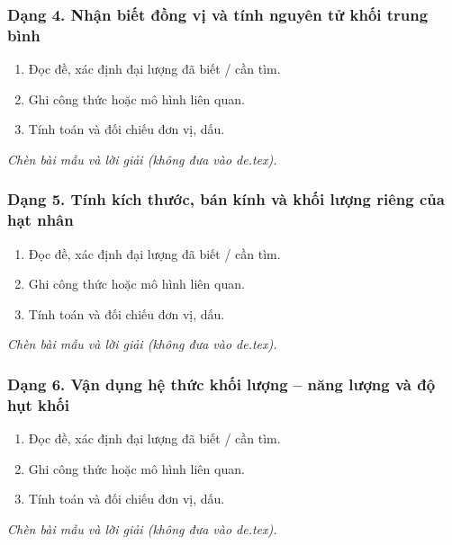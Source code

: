 \subsubsection{Dạng 4. Nhận biết đồng vị và tính nguyên tử khối trung bình}
\begin{phuongphap}
\begin{enumerate}
\item Đọc đề, xác định đại lượng đã biết / cần tìm.
\item Ghi công thức hoặc mô hình liên quan.
\item Tính toán và đối chiếu đơn vị, dấu.
\end{enumerate}
\end{phuongphap}
\begin{vidumau}
\textit{Chèn bài mẫu và lời giải (không đưa vào de.tex).}
\end{vidumau}

\subsubsection{Dạng 5. Tính kích thước, bán kính và khối lượng riêng của hạt nhân}
\begin{phuongphap}
\begin{enumerate}
\item Đọc đề, xác định đại lượng đã biết / cần tìm.
\item Ghi công thức hoặc mô hình liên quan.
\item Tính toán và đối chiếu đơn vị, dấu.
\end{enumerate}
\end{phuongphap}
\begin{vidumau}
\textit{Chèn bài mẫu và lời giải (không đưa vào de.tex).}
\end{vidumau}

\subsubsection{Dạng 6. Vận dụng hệ thức khối lượng – năng lượng và độ hụt khối}
\begin{phuongphap}
\begin{enumerate}
\item Đọc đề, xác định đại lượng đã biết / cần tìm.
\item Ghi công thức hoặc mô hình liên quan.
\item Tính toán và đối chiếu đơn vị, dấu.
\end{enumerate}
\end{phuongphap}
\begin{vidumau}
\textit{Chèn bài mẫu và lời giải (không đưa vào de.tex).}
\end{vidumau}

